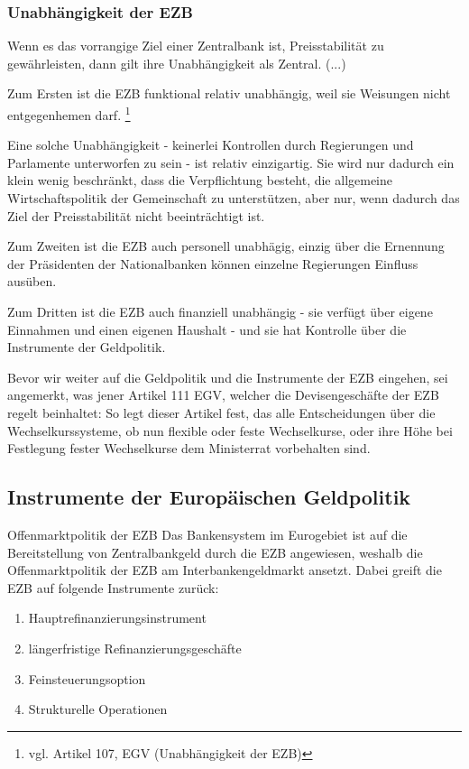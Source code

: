 \documentclass[
  onecolumn,
  a4paper,
  abstracton,
  parskip=half
  ,final
  ]{scrartcl}
\begin{document}
\subsubsection{Unabh{\"a}ngigkeit der EZB}
\citep[vgl.][S.555-557]{Basseler2010}

Wenn es das vorrangige Ziel einer Zentralbank ist, Preisstabilit{\"a}t zu gew{\"a}hrleisten, dann gilt ihre Unabh{\"a}ngigkeit als Zentral. (...)

Zum Ersten ist die EZB funktional relativ unabh{\"a}ngig, weil sie Weisungen nicht entgegenhemen darf. \footnote[34]{vgl. Artikel 107, EGV (Unabh{\"a}ngigkeit der EZB)}

Eine solche Unabh{\"a}ngigkeit - keinerlei Kontrollen durch Regierungen und Parlamente unterworfen zu sein - ist relativ einzigartig. Sie wird nur dadurch ein klein wenig beschr{\"a}nkt, dass die Verpflichtung besteht, die allgemeine Wirtschaftspolitik der Gemeinschaft zu unterst{\"u}tzen, aber nur, wenn dadurch das Ziel der Preisstabilit{\"a}t nicht beeintr{\"a}chtigt ist.

Zum Zweiten ist die EZB auch personell unabh{\"a}gig, einzig {\"u}ber die Ernennung der Pr{\"a}sidenten der Nationalbanken k{\"o}nnen einzelne Regierungen Einfluss aus{\"u}ben.

Zum Dritten ist die EZB auch finanziell unabh{\"a}ngig - sie verf{\"u}gt {\"u}ber eigene Einnahmen und einen eigenen Haushalt - und sie hat Kontrolle {\"u}ber die Instrumente der Geldpolitik.




Bevor wir weiter auf die Geldpolitik und die Instrumente der EZB eingehen, sei angemerkt, was jener Artikel 111 EGV, welcher die Devisengesch{\"a}fte der EZB regelt beinhaltet:
So legt dieser Artikel fest, das alle Entscheidungen {\"u}ber die Wechselkurssysteme, ob nun flexible oder feste Wechselkurse, oder ihre H{\"o}he bei Festlegung fester Wechselkurse dem Ministerrat vorbehalten sind. \citep[vgl.][S.555]{Basseler2010}




\subsection{Instrumente der Europ{\"a}ischen Geldpolitik}
\citep[vgl.][S.558f]{Basseler2010}

Offenmarktpolitik der EZB
Das Bankensystem im Eurogebiet ist auf die Bereitstellung von Zentralbankgeld durch die EZB angewiesen, weshalb die Offenmarktpolitik der EZB am Interbankengeldmarkt ansetzt. Dabei greift die EZB auf folgende Instrumente zur{\"u}ck:
\begin{enumerate}
 \item{Hauptrefinanzierungsinstrument}
 \item{l{\"a}ngerfristige Refinanzierungsgesch{\"a}fte}
 \item{Feinsteuerungsoption}
 \item{Strukturelle Operationen}
 \end{enumerate}
\end{document}
